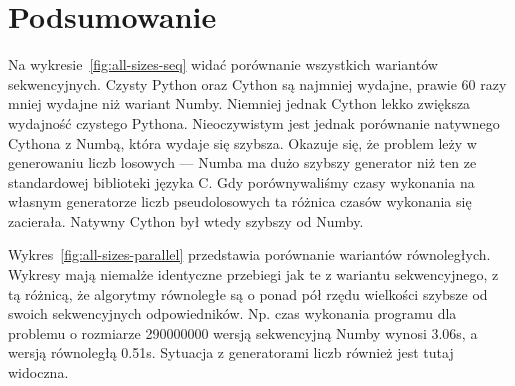 \begin{figure*}
    \centering
    
    \caption{Czas wykonania algorytmu w zależności od rozmiaru problemu}
    \label{fig:all-sizes-seq}
\end{figure*}


\begin{figure*}
    \centering
    
    \caption{Czas wykonania algorytmu w zależności od rozmiaru problemu}
    \label{fig:all-sizes-parallel}
\end{figure*}

\begin{figure*}
    \centering
    \begin{minipage}[b]{.45\textwidth}
        \centering
        
        \caption{Czas wykonania algorytmu w zależności od liczby wątków}
        \label{fig:all-threads}
    \end{minipage}
    \hfill
    \begin{minipage}[b]{.45\textwidth}
        \centering
        
        \caption{Przyspieszenie liczenia liczby $\pi$}
        \label{fig:all-speedup}
    \end{minipage}
\end{figure*}

\section{Podsumowanie}

Na wykresie~\ref{fig:all-sizes-seq} widać porównanie
wszystkich wariantów sekwencyjnych.
Czysty Python oraz Cython są najmniej wydajne,
prawie 60 razy mniej wydajne niż wariant Numby.
Niemniej jednak Cython lekko zwiększa wydajność czystego Pythona.
Nieoczywistym jest jednak porównanie natywnego Cythona z Numbą,
która wydaje się szybsza.
Okazuje się, że problem leży w generowaniu liczb losowych ---
Numba ma dużo szybszy generator niż ten ze standardowej biblioteki
języka C\@.
Gdy porównywaliśmy czasy wykonania na własnym generatorze liczb pseudolosowych
ta różnica czasów wykonania się zacierała.
Natywny Cython był wtedy szybszy od Numby.

Wykres~\ref{fig:all-sizes-parallel} przedstawia porównanie wariantów równoległych.
Wykresy mają niemalże identyczne przebiegi jak te z wariantu sekwencyjnego,
z tą różnicą, że algorytmy równoległe są o ponad pół rzędu wielkości szybsze
od swoich sekwencyjnych odpowiedników. Np. czas wykonania programu
dla problemu o rozmiarze 290000000 wersją sekwencyjną Numby wynosi 3.06s,
a wersją równoległą 0.51s.
Sytuacja z generatorami liczb również jest tutaj widoczna.

